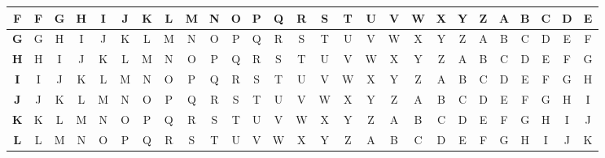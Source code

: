 \begin{table}[H]
\begin{tabular}{|c||c|c|c|c|c|c|c|c|c|c|c|c|c|c|c|c|c|c|c|c|c|c|c|c|c|c|}
						\textbf{F} & F          & G          & H          & I          & J          & K          & L          & M          & N          & O          & P          & Q          & R          & S          & T          & U          & V          & W          & X          & Y          & Z          & A          & B          & C          & D          & E          \\ \hline
						\textbf{G} & G          & H          & I          & J          & K          & L          & M          & N          & O          & P          & Q          & R          & S          & T          & U          & V          & W          & X          & Y          & Z          & A          & B          & C          & D          & E          & F          \\ \hline
						\textbf{H} & H          & I          & J          & K          & L          & M          & N          & O          & P          & Q          & R          & S          & T          & U          & V          & W          & X          & Y          & Z          & A          & B          & C          & D          & E          & F          & G          \\ \hline
						\textbf{I} & I          & J          & K          & L          & M          & N          & O          & P          & Q          & R          & S          & T          & U          & V          & W          & X          & Y          & Z          & A          & B          & C          & D          & E          & F          & G          & H          \\ \hline
						\textbf{J} & J          & K          & L          & M          & N          & O          & P          & Q          & R          & S          & T          & U          & V          & W          & X          & Y          & Z          & A          & B          & C          & D          & E          & F          & G          & H          & I          \\ \hline
						\textbf{K} & K          & L          & M          & N          & O          & P          & Q          & R          & S          & T          & U          & V          & W          & X          & Y          & Z          & A          & B          & C          & D          & E          & F          & G          & H          & I          & J          \\ \hline
						\textbf{L} & L          & M          & N          & O          & P          & Q          & R          & S          & T          & U          & V          & W          & X          & Y          & Z          & A          & B          & C          & D          & E          & F          & G          & H          & I          & J          & K          \\ \hline

\end{tabular}
\end{table}
